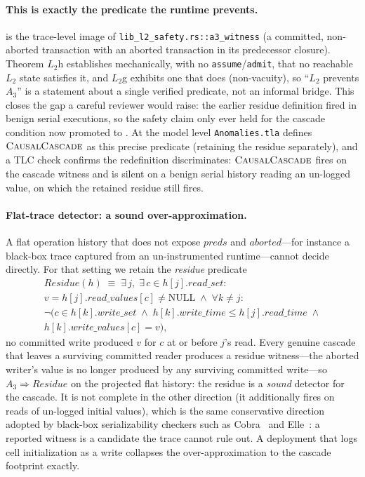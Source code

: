 \documentclass[journal,compsoc,10pt]{IEEEtran}
\providecommand{\citep}{\cite}
\theoremstyle{definition}
\theoremstyle{remark}
\newcommand{\fld}[1]{\mathit{#1}}
\newcommand{\rs}{\fld{read\_set}}
\newcommand{\ws}{\fld{write\_set}}
\newcommand{\rt}{\fld{read\_time}}
\newcommand{\wt}{\fld{write\_time}}
\newcommand{\rv}{\fld{read\_values}}
\newcommand{\wv}{\fld{write\_values}}
\begin{document}
\paragraph{This is exactly the predicate the runtime prevents.}
 is the trace-level image of \texttt{lib\_l2\_safety.rs::a3\_witness}
(a committed, non-aborted transaction with an aborted transaction in its
predecessor closure). Theorem $L_2$h establishes mechanically, with no
\texttt{assume}/\texttt{admit}, that no reachable $L_2$ state satisfies it,
and $L_2$g exhibits one that does (non-vacuity), so ``$L_2$ prevents $A_3$''
is a statement about a single verified predicate, not an informal bridge.
This closes the gap a careful reviewer would raise: the earlier residue
definition fired in benign serial executions, so the safety claim only ever
held for the cascade condition now promoted to . At the model
level \texttt{Anomalies.tla} defines $\textsc{CausalCascade}$ as this
precise predicate (retaining the residue separately), and a TLC check
confirms the redefinition discriminates: $\textsc{CausalCascade}$ fires on
the cascade witness and is silent on a benign serial history reading an
un-logged value, on which the retained residue still fires.

\paragraph{Flat-trace detector: a sound over-approximation.}
A flat operation history that does not expose $\fld{preds}$ and
$\fld{aborted}$---for instance a black-box trace captured from an
un-instrumented runtime---cannot decide  directly. For that
setting we retain the \emph{residue} predicate
\begin{multline*}
  \fld{Residue}(h) \;\equiv\; \exists\, j,\; \exists\, c \in h[j].\rs:\; \\
  v = h[j].\rv[c] \neq \mathrm{NULL} \;\wedge\; \forall k \neq j: \\
  \neg\bigl(c \in h[k].\ws \;\wedge\; h[k].\wt \le h[j].\rt \;\wedge\\
  h[k].\wv[c] = v\bigr),
\end{multline*}
no committed write produced $v$ for $c$ at or before $j$'s read. Every
genuine cascade that leaves a surviving committed reader produces a residue
witness---the aborted writer's value is no longer produced by any surviving
committed write---so $A_3 \Rightarrow \fld{Residue}$ on the projected flat
history: the residue is a \emph{sound} detector for the cascade. It is not
complete in the other direction (it additionally fires on reads of
un-logged initial values), which is the same conservative direction adopted
by black-box serializability checkers such as
Cobra~\citep{TanEtAl2020Cobra} and Elle~\citep{Aphyr2020Elle}: a reported
witness is a candidate the trace cannot rule out. A deployment that logs
cell initialization as a write collapses the over-approximation to the
cascade footprint exactly.
\end{document}
